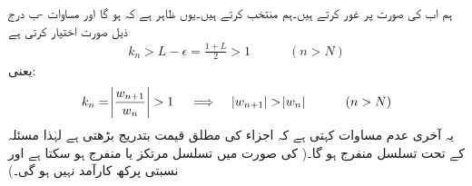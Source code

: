 ہم اب  کی صورت پر غور کرتے ہیں۔ہم  منتخب کرتے ہیں۔یوں ظاہر ہے کہ  ہو گا اور  مساوات -ب درج ذیل صورت اختیار کرتی ہے
\begin{align}
k_n>L-\epsilon=\frac{1+L}{2}>1\quad \quad \quad (n>N)
\end{align}
یعنی:
\begin{align}
k_n=\abs{\frac{w_{n+1}}{w_n}}>1 \quad \implies \quad \abs{w_{n+1}}>\abs{w_n} \quad \quad \quad (n>N)
\end{align}
یہ آخری عدم مساوات کہتی ہے کہ اجزاء کی مطلق قیمت بتدریج بڑھتی ہے لہٰذا مسئلہ  کے تحت تسلسل منفرج ہو گا۔( کی صورت میں تسلسل مرتکز یا منفرج ہو سکتا ہے اور  نسبتی پرکھ کارآمد نہیں ہو گی۔)

